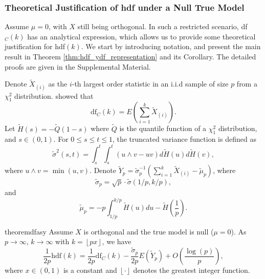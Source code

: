 \subsubsection{Theoretical Justification of hdf under a Null True Model}
Assume $\mu=0$, with $X$ still being orthogonal. In such a restricted scenario, df$_C(k)$ has an analytical expression, which allows us to provide some theoretical justification for hdf$(k)$. We start by introducing notation, and present the main result in Theorem \ref{thm:hdf_ydf_representation} and its Corollary. The detailed proofs are given in the Supplemental Material.

Denote $\tilde{X}_{(i)}$ as the $i$-th largest order statistic in an i.i.d sample of size $p$ from a $\chi^2_1$ distribution. \citet{Ye1998} showed that
\begin{equation*}
\text{df}_C(k) = E\left( \sum_{i=1}^{k} \tilde{X}_{(i)} \right).
\end{equation*}
Let $\tilde{H}(s) = -\tilde{Q}(1-s)$ where $\tilde{Q}$ is the quantile function of a $\chi_1^2$ distribution, and $s\in (0,1)$. For $0\le s \le t \le 1$, the truncated variance function is defined as
\begin{equation*}
\tilde{\sigma}^2(s,t) = \int_{s}^{t} \int_{s}^{t} (u \wedge v -uv) d \tilde{H}(u) d \tilde{H}(v),
\end{equation*}
where $u \wedge v =\min(u,v)$. Denote $\tilde{Y}_p = \tilde{\sigma}_p^{-1}(\sum_{i=1}^k \tilde{X}_{(i)} - \tilde{\mu}_p)$, where
\begin{equation*}
\tilde{\sigma}_p = \sqrt{p} \cdot \tilde{\sigma}(1/p,k/p),
\end{equation*}
and
\begin{equation*}
\tilde{\mu}_p = -p \int_{1/p}^{k/p} \tilde{H}(u) du - \tilde{H}\left(\frac{1}{p}\right).
\end{equation*}

\begin{restatable}{theorem}{dfasy}
	\label{thm:hdf_ydf_representation}
	Assume $X$ is orthogonal and the true model is null ($\mu=0$). As $p\rightarrow  \infty$,  $k\rightarrow  \infty$ with $k=\left \lfloor{px}\right \rfloor$, we have
	\begin{equation}
	\label{eq:hdf_ydf_yp_representation}
	\frac{1}{2p} \text{hdf}(k) = \frac{1}{2p}\text{df}_C(k) - \frac{\tilde{\sigma}_p}{2p}E(\tilde{Y}_p) + O\left(\frac{\log(p)}{p} \right),
	\end{equation}
	where $x \in (0,1)$ is a constant and $\left \lfloor{\cdot}\right \rfloor$ denotes the greatest integer function.
\end{restatable}


